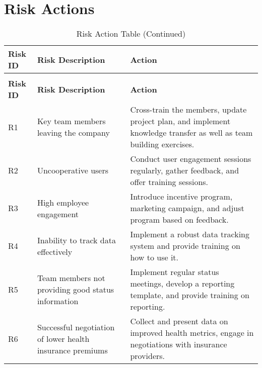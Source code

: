 \section*{Risk Actions}
\begin{longtable}{|p{1cm}|p{5cm}|p{9cm}|}
    \caption{Risk Action Table} \label{tab:title} \\
    \hline
    \textbf{Risk ID} & \textbf{Risk Description} & \textbf{Action} \\
    \hline
    \endfirsthead
    \caption[]{Risk Action Table (Continued)} \\
    \hline
    \textbf{Risk ID} & \textbf{Risk Description} & \textbf{Action} \\
    \hline
    \endhead
    \hline
    \endfoot
    \hline
    \endlastfoot
    R1 & Key team members leaving the company & Cross-train the members, update project plan, and implement knowledge transfer as well as team building exercises. \\
    \hline
    R2 & Uncooperative users & Conduct user engagement sessions regularly, gather feedback, and offer training sessions. \\
    \hline
    R3 & High employee engagement & Introduce incentive program, marketing campaign, and adjust program based on feedback. \\
    \hline
    R4 & Inability to track data effectively & Implement a robust data tracking system and provide training on how to use it. \\
    \hline
    R5 & Team members not providing good status information & Implement regular status meetings, develop a reporting template, and provide training on reporting. \\
    \hline
    R6 & Successful negotiation of lower health insurance premiums & Collect and present data on improved health metrics, engage in negotiations with insurance providers. \\
    \hline
\end{longtable}

\pagebreak
